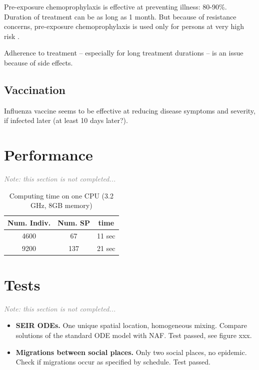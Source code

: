 \documentclass[11pt, onecolumn]{article}
\newcommand{\note}[1]{\textit{\textcolor{Grey}{Note: #1}}}
\newcommand{\naf}{\textsf{NAF}\xspace}
\begin{document}
Pre-exposure chemoprophylaxis is effective at preventing illness: 80-90\%. Duration of treatment can be as long as 1 month. But because of resistance concerns, pre-exposure chemoprophylaxis is used only for persons at very high risk \cite{CDC:2011wq}. 

Adherence to treatment -- especially for long treatment durations -- is an issue because of side effects.



\subsection{Vaccination}

Influenza vaccine seems to be effective at reducing disease symptoms and severity, if infected later (at least 10 days later?).


\section{Performance}

\note{this section is not completed...}


\begin{table}[htdp]
\caption{Computing time on one CPU (3.2 GHz, 8GB memory) }
\begin{center}
\begin{tabular}{|ccc|}
\hline
Num. Indiv. & Num. SP & time\\
\hline
4600 & 67 & 11 sec\\
9200 & 137 & 21 sec\\

\hline
\end{tabular}
\end{center}
\label{default}
\end{table}%



\section{Tests}

\note{this section is not completed...}

\begin{itemize}
\item \textbf{SEIR ODEs.} One unique spatial location, homogeneous mixing. Compare solutions of the standard ODE model with \naf. Test passed, see figure xxx.
\item \textbf{Migrations between social places.} Only two social places, no epidemic. Check if migrations occur as specified by schedule. Test passed. 
\end{itemize}




\end{document}
